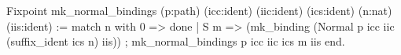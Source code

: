 Fixpoint mk_normal_bindings (p:path) (icc:ident) (iic:ident) 
                             (ics:ident) (n:nat) (iis:ident) :=
 match n with
    0   => done 
  | S m => 
    (mk_binding (Normal p icc iic (suffix_ident ics n) iis)) ;
    mk_normal_bindings p icc iic ics m iis
end.
